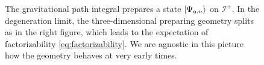 \documentclass[12pt,a4paper]{article}
\begin{document}
\begin{figure}
    \caption{The gravitational path integral prepares a state $\ket{\Psi_{g,n}}$ on $\mathcal{I}^+$. In the degeneration limit, the three-dimensional preparing geometry splits as in the right figure, which leads to the expectation of factorizability \eqref{eq:factorizability}. We are agnostic in this picture how the geometry behaves at very early times. }
    \label{fig:factorizability}
\end{figure}
\end{document}
